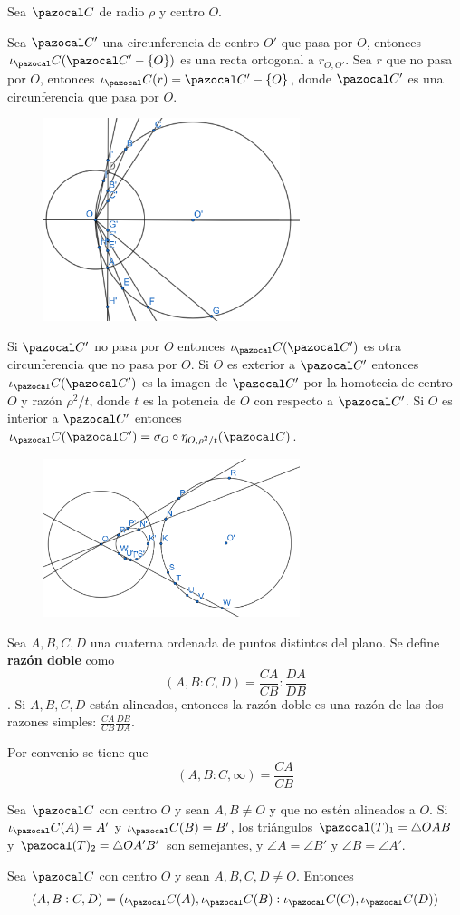  Sea $\C$ de radio $\rho$ y centro $O$.
\begin{itemizex}
	\item Sea $\C'$ una circunferencia de centro $O'$ que pasa por $O$, entonces $\iota_\C(\C'-\{O\})$ es una recta ortogonal a $r_{O,O'}$. Sea $r$ que no pasa por $O$, entonces $\iota_\C(r) = \C'-\{O\}$, donde $\C'$ es una circunferencia que pasa por $O$.
	\begin{figure}[H]
		\centering
		\includegraphics[width=7.5cm]{figuras/8-18-1.png}
		\vspace{-1em}
	\end{figure}
	\item Si $\C'$ no pasa por $O$ entonces $\iota_\C(\C')$ es otra circunferencia que no pasa por $O$. Si $O$ es exterior a $\C'$ entonces $\iota_\C(\C')$ es la imagen de $\C'$ por la homotecia de centro $O$ y razón $\rho^2/t$, donde $t$ es la potencia de $O$ con respecto a $\C'$. Si $O$ es interior a $\C'$ entonces $\iota_\C(\C') = \sigma_O \circ \eta_{O,\rho^2/t}(\C)$.
	\begin{figure}[H]
		\centering
		\includegraphics[width=7.5cm]{figuras/8-18-2.png}
		\vspace{-1em}
	\end{figure}
\end{itemizex}

 Sea $A,B,C,D$ una cuaterna ordenada de puntos distintos del plano. Se define \textbf{razón doble} como 
$$(A,B:C,D) = \frac{CA}{CB}:\frac{DA}{DB}$$. 
Si $A,B,C,D$ están alineados, entonces la razón doble es una razón de las dos razones simples: $\frac{CA}{CB}\frac{DB}{DA}$.

Por convenio se tiene que 
$$(A,B:C,\infty) = \frac{CA}{CB}$$


 Sea $\C$ con centro $O$ y sean $A,B \neq O$ 
y que no estén alineados a $O$. Si $\iota_\C(A)=A'$ y $\iota_\C(B) = B'$, los triángulos $\pazocal(T)_1 = \triangle OAB$ y $\pazocal (T)_2 = \triangle OA'B'$ son semejantes, y $\angle A = \angle B'$ y $\angle B = \angle A'$.

 Sea $\C$ con centro $O$ y sean $A, B, C, D\neq O$. Entonces
$$(A,B:C,D) = (\iota_\C(A), \iota_\C(B):\iota_\C(C),\iota_\C(D))$$

